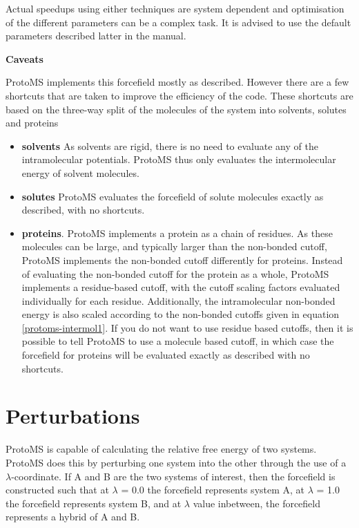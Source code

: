 \documentclass[letterpaper,10pt,english]{manual}
\begin{document}
Actual speedups using either techniques are system dependent and optimisation of the different parameters can be a complex task. It is advised to use the default parameters described latter in the manual.

\textbf{Caveats}

ProtoMS implements this forcefield mostly as described. However there are a few shortcuts that are taken to improve the efficiency of the code. These shortcuts are based on the three-way split of the molecules of the system into solvents, solutes and proteins
\begin{itemize}
\item {} 
\textbf{solvents} As solvents are rigid, there is no need to evaluate any of the intramolecular potentials. ProtoMS thus only evaluates the intermolecular energy of solvent molecules.

\item {} 
\textbf{solutes} ProtoMS evaluates the forcefield of solute molecules exactly as described, with no shortcuts.

\item {} 
\textbf{proteins}. ProtoMS implements a protein as a chain of residues. As these molecules can be large, and typically larger than the non-bonded cutoff, ProtoMS implements the non-bonded cutoff differently for proteins. Instead of evaluating the non-bonded cutoff for the protein as a whole, ProtoMS implements a residue-based cutoff, with the cutoff scaling factors evaluated individually for each residue. Additionally, the intramolecular non-bonded energy is also scaled according to the non-bonded cutoffs given in equation \eqref{protoms-intermol1}. If you do not want to use residue based cutoffs, then it is possible to tell ProtoMS to use a molecule based cutoff, in which case the forcefield for proteins will be evaluated exactly as described with no shortcuts.

\end{itemize}

\section{Perturbations}

ProtoMS is capable of calculating the relative free energy of two systems. ProtoMS does this by perturbing one system into the other through the use of a $\lambda$-coordinate. If A and B are the two systems of interest, then the forcefield is constructed such that at $\lambda$ = 0.0 the forcefield represents system A, at $\lambda$ = 1.0 the forcefield represents system B, and at $\lambda$ value inbetween, the forcefield represents a hybrid of A and B.
\end{document}
